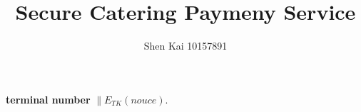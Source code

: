 \documentclass{article}
\title{Secure Catering Paymeny Service}
\author{Shen Kai 10157891}
\begin{document}
    \maketitle
\textbf{  terminal number} $\parallel E_{TK}(nouce)$. 
\end{document}
